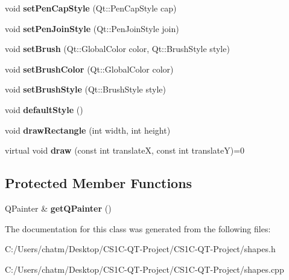 \begin{DoxyCompactItemize}
\item 
\mbox{\label{class_shapes_1_1_shape_aa832edc6c0597c0f9a299957a98ec407}} 
void {\bfseries set\+Pen\+Cap\+Style} (Qt\+::\+Pen\+Cap\+Style cap)
\item 
\mbox{\label{class_shapes_1_1_shape_a483b665bb69276756809d7efa3e110a9}} 
void {\bfseries set\+Pen\+Join\+Style} (Qt\+::\+Pen\+Join\+Style join)
\item 
\mbox{\label{class_shapes_1_1_shape_a1c47170a6f044047eedd397f38e81580}} 
void {\bfseries set\+Brush} (Qt\+::\+Global\+Color color, Qt\+::\+Brush\+Style style)
\item 
\mbox{\label{class_shapes_1_1_shape_a313cb62dfd56ee41b5c2278d80ec9afc}} 
void {\bfseries set\+Brush\+Color} (Qt\+::\+Global\+Color color)
\item 
\mbox{\label{class_shapes_1_1_shape_a9d1d26c2a0d99e4560145e81782cc461}} 
void {\bfseries set\+Brush\+Style} (Qt\+::\+Brush\+Style style)
\item 
\mbox{\label{class_shapes_1_1_shape_aa95d1c5bbb713a7fc0009e9373958c42}} 
void {\bfseries default\+Style} ()
\item 
\mbox{\label{class_shapes_1_1_shape_ab139016613335fa9f81e533f3258f68e}} 
void {\bfseries draw\+Rectangle} (int width, int height)
\item 
\mbox{\label{class_shapes_1_1_shape_aacec38ec3055587a462b3422af9e8748}} 
virtual void {\bfseries draw} (const int translateX, const int translateY)=0
\end{DoxyCompactItemize}
\subsection*{Protected Member Functions}
\begin{DoxyCompactItemize}
\item 
\mbox{\label{class_shapes_1_1_shape_ac83754d9a36ce0b6dd8badc7af4ca4b7}} 
Q\+Painter \& {\bfseries get\+Q\+Painter} ()
\end{DoxyCompactItemize}


The documentation for this class was generated from the following files\+:\begin{DoxyCompactItemize}
\item 
C\+:/\+Users/chatm/\+Desktop/\+C\+S1\+C-\/\+Q\+T-\/\+Project/\+C\+S1\+C-\/\+Q\+T-\/\+Project/shapes.\+h\item 
C\+:/\+Users/chatm/\+Desktop/\+C\+S1\+C-\/\+Q\+T-\/\+Project/\+C\+S1\+C-\/\+Q\+T-\/\+Project/shapes.\+cpp\end{DoxyCompactItemize}
